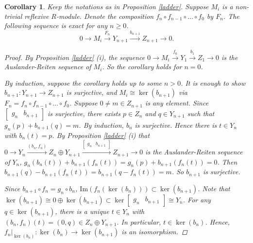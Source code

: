 \documentclass{amsart}[12pt]
\newtheorem{cor}[theorem]{Corollary}
\theoremstyle{definition}
\theoremstyle{remark}
\numberwithin{equation}{section}
\begin{document}
\begin{cor}\label{ladseq}
Keep the notations as in Proposition \ref{ladder}. Suppose $M_i$ is a non-trivial reflexive $R$-module. Denote the composition $f_n \circ f_{n - 1} \circ \dots \circ f_0$ by $F_n$. The following sequence is exact for any $n \geq 0$.
\[
0 \to M_i \xrightarrow{F_n} Y_{n + 1} \xrightarrow{b_{n + 1}} Z_{n + 1} \to 0.
\]
\begin{proof}
By Proposition \ref{ladder} (i), the sequence $0 \to M_i \xrightarrow{f_0} Y_1 \xrightarrow{b_1} Z_1 \to 0$ is the Auslander-Reiten sequence of $M_i$. So the corollary holds for $n = 0$. 

By induction, suppose the corollary holds up to some $n > 0$. It is enough to show $b_{n + 1}: Y_{n + 1} \to Z_{n + 1}$ is surjective, and $M_i \cong \ker (b_{n + 1})$ via $F_n = f_n \circ f_{n - 1} \circ \dots \circ f_0$. Suppose $0 \neq m \in Z_{n + 1}$ is any element. Since $\begin{bmatrix} g_n & b_{n + 1} \end{bmatrix}$ is surjective, there exists $p \in Z_n$ and $q \in Y_{n + 1}$ such that $g_n(p) + b_{n + 1}(q) = m$. By induction, $b_n$ is surjective. Hence there is $t \in Y_n$ with $b_n (t) = p$. By Proposition \ref{ladder} (i) that $0 \to Y_n \xrightarrow{(b_n, f_n)} Z_n \oplus Y_{n + 1} \xrightarrow{\begin{bmatrix} g_n & b_{n + 1} \end{bmatrix}} Z_{n + 1} \to 0$ is the Auslander-Reiten sequence of $Y_n$, $g_n(b_n(t)) + b_{n + 1}(f_n(t)) = g_n(p) + b_{n + 1}(f_n(t)) = 0$. Then $b_{n + 1}(q) - b_{n + 1}(f_n(t)) = b_{n + 1}(q - f_n(t)) = m$. So $b_{n + 1}$ is surjective.  

Since $b_{n + 1} \circ f_n = g_n \circ b_n$, $\mathrm{Im}(f_n(\ker(b_n))) \subset \ker (b_{n + 1})$. Note that $\ker (b_{n + 1}) \cong 0 \oplus \ker (b_{n + 1}) \subset \ker \begin{bmatrix} g_n & b_{n + 1} \end{bmatrix} \cong Y_n$. For any $q \in \ker (b_{n + 1})$, there is a unique $t \in Y_n$ with $(b_n, f_n)(t) = (0, q) \in Z_n \oplus Y_{n + 1}$. In particular, $t \in \ker (b_n)$. Hence, $f_n \vert_{\ker(b_n)}:  \ker(b_n) \to \ker (b_{n + 1})$ is an isomorphism.   
\end{proof}
\end{cor}
\end{document}
